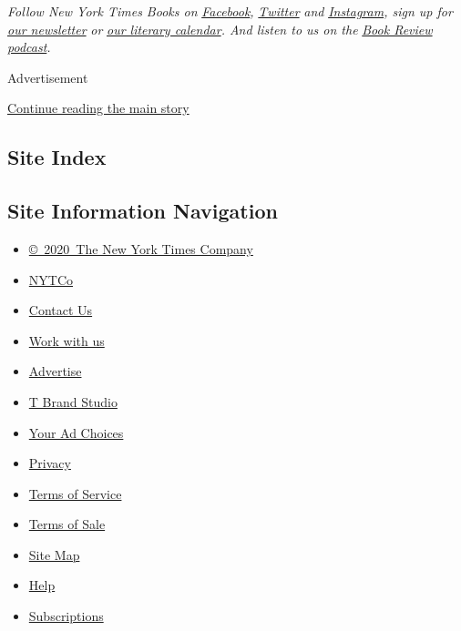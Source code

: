 \emph{Follow New York Times Books on}
\href{https://www.facebook.com/nytbooks/}{\emph{Facebook}}\emph{,}
\href{https://twitter.com/nytimesbooks}{\emph{Twitter}} \emph{and}
\href{https://www.instagram.com/nytbooks/}{\emph{Instagram}}\emph{, sign
up for}
\href{https://www.nytimes.com/newsletters/books-review}{\emph{our
newsletter}} \emph{or}
\href{https://www.nytimes.com/interactive/2017/books/books-calendar.html}{\emph{our
literary calendar}}\emph{. And listen to us on the}
\href{https://www.nytimes.com/column/book-review-podcast}{\emph{Book
Review podcast}}\emph{.}

Advertisement

\protect\hyperlink{after-bottom}{Continue reading the main story}

\hypertarget{site-index}{%
\subsection{Site Index}\label{site-index}}

\hypertarget{site-information-navigation}{%
\subsection{Site Information
Navigation}\label{site-information-navigation}}

\begin{itemize}
\tightlist
\item
  \href{https://help.nytimes.com/hc/en-us/articles/115014792127-Copyright-notice}{©~2020~The
  New York Times Company}
\end{itemize}

\begin{itemize}
\tightlist
\item
  \href{https://www.nytco.com/}{NYTCo}
\item
  \href{https://help.nytimes.com/hc/en-us/articles/115015385887-Contact-Us}{Contact
  Us}
\item
  \href{https://www.nytco.com/careers/}{Work with us}
\item
  \href{https://nytmediakit.com/}{Advertise}
\item
  \href{http://www.tbrandstudio.com/}{T Brand Studio}
\item
  \href{https://www.nytimes.com/privacy/cookie-policy\#how-do-i-manage-trackers}{Your
  Ad Choices}
\item
  \href{https://www.nytimes.com/privacy}{Privacy}
\item
  \href{https://help.nytimes.com/hc/en-us/articles/115014893428-Terms-of-service}{Terms
  of Service}
\item
  \href{https://help.nytimes.com/hc/en-us/articles/115014893968-Terms-of-sale}{Terms
  of Sale}
\item
  \href{https://spiderbites.nytimes.com}{Site Map}
\item
  \href{https://help.nytimes.com/hc/en-us}{Help}
\item
  \href{https://www.nytimes.com/subscription?campaignId=37WXW}{Subscriptions}
\end{itemize}
